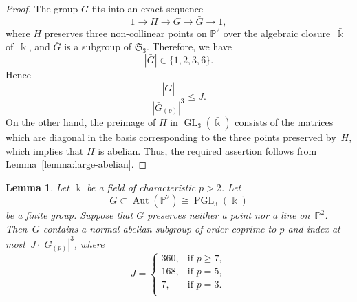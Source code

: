 \documentclass[12pt]{amsart}
\numberwithin{equation}{section}
\newtheorem{lemma}[subsection]{Lemma}
\theoremstyle{definition}
\newcommand{\PP}{\mathbb P}
\DeclareMathOperator{\Aut}{Aut}
\DeclareMathOperator{\GL}{GL}
\DeclareMathOperator{\PGL}{PGL}
\def \ge {\geqslant}
\def \le {\leqslant}
\begin{document}
\begin{proof}
The group $G$ fits into an exact sequence
$$
1\to H\to G\to\bar{G}\to 1,
$$
where $H$ preserves three non-collinear points on $\PP^2$ over the algebraic closure~$\bar{\Bbbk}$
of~$\Bbbk$,
and $\bar{G}$ is a subgroup of $\mathfrak{S}_3$.
Therefore, we have
$$
|\bar{G}|\in\big\{1, 2, 3, 6\big\}.
$$
Hence
\begin{equation*}
\frac{|\bar{G}|}{|\bar{G}_{(p)}|^3}\le J.
\end{equation*}
On the other hand, the preimage of $H$ in $\GL_3\left(\bar{\Bbbk}\right)$
consists of the matrices which are diagonal in the basis corresponding to the three points
preserved by~$H$, which implies that $H$ is abelian.
Thus, the required assertion follows from Lemma~\ref{lemma:large-abelian}.
\end{proof}


\begin{lemma}\label{lemma:P2-preliminary}
Let $\Bbbk$ be a field of characteristic $p>2$.
Let
$$
G\subset \Aut(\PP^2)\cong \PGL_3(\Bbbk)
$$
be a finite group.
Suppose that $G$ preserves neither a point nor a line
on~$\PP^2$.
Then~$G$ contains a normal abelian subgroup
of order coprime
to $p$ and index at most~\mbox{$J\cdot |G_{(p)}|^{3}$},
where
\begin{equation*}
J=\begin{cases}
360, &\text{if\ } p\ge 7,\\
168, &\text{if\ } p=5,\\
7, &\text{if\ } p=3.\\
\end{cases}
\end{equation*}
\end{lemma}
\end{document}
